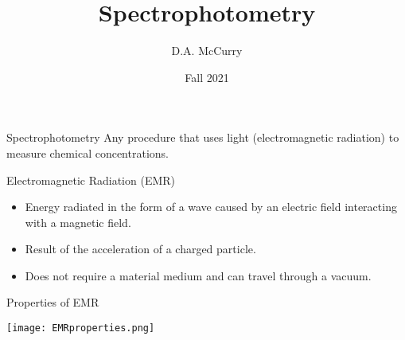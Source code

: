\documentclass[notes=show]{beamer}
\title{Spectrophotometry}
\institute{CHEM321 --- Analytical Chemistry I \\ Bloomsburg University}
\author{D.A. McCurry}
\date{Fall 2021}
\begin{document}

\maketitle
{}


\begin{frame}{Spectrophotometry}
	Any procedure that uses light (electromagnetic radiation) to measure
	chemical concentrations.

	\bigskip

	\begin{block}{Electromagnetic Radiation (EMR)}
		\begin{itemize}
			\item Energy radiated in the form of a \alert{wave}
				caused by an electric field interacting with a
				magnetic field.
			\item Result of the acceleration of a charged particle.
			\item Does not require a material medium and can travel
				through a vacuum.
		\end{itemize}
	\end{block}
\end{frame}


\begin{frame}{Properties of EMR}

	\begin{center}
		\texttt{[image: EMRproperties.png]}
	\end{center}
\end{frame}
\end{document}

